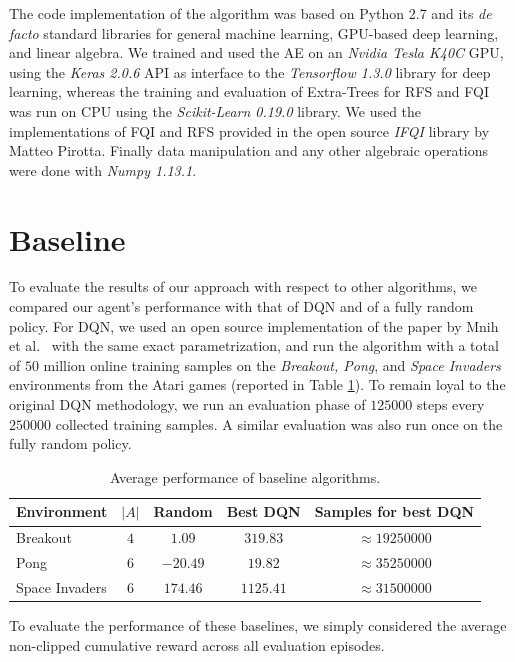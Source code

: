 The code implementation of the algorithm was based on Python 2.7 and its 
\textit{de facto} standard libraries for general machine learning, GPU-based 
deep learning, and linear algebra. 
We trained and used the AE on an \textit{Nvidia Tesla K40C} GPU, using the 
\textit{Keras 2.0.6} API as interface to the \textit{Tensorflow 1.3.0} library 
for deep learning, whereas the training and evaluation of Extra-Trees 
for RFS and FQI was run on CPU using the \textit{Scikit-Learn 0.19.0} library.
We used the implementations of FQI and RFS provided in the open source 
\textit{IFQI} library by Matteo Pirotta.
Finally data manipulation and any other algebraic operations were done with 
\textit{Numpy 1.13.1}.

\section{Baseline}\label{s:exp_baseline}
To evaluate the results of our approach with respect to other algorithms, we 
compared our agent's performance with that of DQN and of a fully random policy. 
For DQN, we used an open source implementation of the paper by Mnih et al.\ \cite{mnih2015human} 
with the same exact parametrization, and run the algorithm with a total of $50$ 
million online training samples on the \textit{Breakout, Pong}, and 
\textit{Space Invaders} environments from the Atari games (reported in Table \ref{t:envs_used}).
To remain loyal to the original DQN methodology, we run an evaluation phase 
of $125000$ steps every $250000$ collected training samples. A similar 
evaluation was also run once on the fully random policy.
%
\begin{table}
    \centering
    \begin{tabular}{l c c c c} 
	\hline
	Environment    & $|A|$ & Random   & Best DQN  & Samples for best DQN \\ 
	\hline 
	Breakout       & $4$   & $1.09$   & $319.83$  & $\approx19250000$ \\
	Pong           & $6$   & $-20.49$ & $19.82$   & $\approx35250000$ \\
	Space Invaders & $6$   & $174.46$ & $1125.41$ & $\approx31500000$ \\
	\hline
    \end{tabular}
    \caption[Performance of baseline algorithms]{Average performance of baseline
	     algorithms.}
    \label{t:envs_used}
\end{table}
%
To evaluate the performance of these baselines, we simply considered the average 
non-clipped cumulative reward across all evaluation episodes. 
